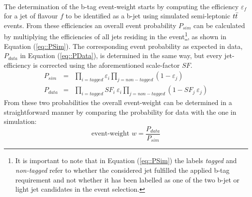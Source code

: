 \\
The determination of the b-tag event-weight starts by computing the efficiency $\varepsilon_{f}$ for a jet of flavour $f$ to be identified as a b-jet using simulated semi-leptonic $t\bar{t}$ events.
From these efficiencies an overall event probability $P_{sim}$ can be calculated by multiplying the efficiencies of all jets residing in the event\footnote{It is important to note that in Equation (\ref{eq::PSim}) the labels \textit{tagged} and \textit{non-tagged} refer to whether the considered jet fulfilled the applied b-tag requirement and not whether it has been labelled as one of the two b-jet or light jet candidates in the event selection.}, as shown in Equation (\ref{eq::PSim}).
The corresponding event probability as expected in data, $P_{data}$ in Equation (\ref{eq::PData}), is determined in the same way, but every jet-efficiency is corrected using the aforementioned scale-factor $SF$.
\begin{eqnarray} 
 P_{sim} & = & \prod_{i = tagged} \varepsilon_{i} \prod_{j = non-tagged} (1-\varepsilon_{j})  \label{eq::PSim} \\
 P_{data} & = & \prod_{i = tagged} SF_{i} ~ \varepsilon_{i} \prod_{j = non-tagged} (1- SF_{j} ~ \varepsilon_{j}) \label{eq::PData}
\end{eqnarray}
From these two probabilities the overall event-weight can be determined in a straightforward manner by comparing the probability for data with the one in simulation:
\begin{equation}
 \textrm{event-weight } w = \dfrac{P_{data}}{P_{sim}}
\end{equation}

